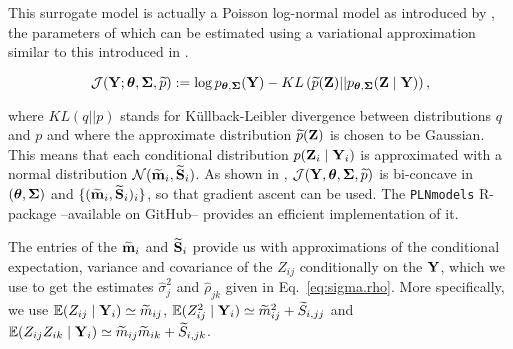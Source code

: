 This surrogate model is actually a Poisson log-normal model as introduced by \cite{AiH89}, the parameters of which can be estimated using a variational approximation similar to this introduced in \cite{CMR18}. 
\begin{linenomath} 
\begin{equation}\label{eq:LowerBound}
\mathcal{J}({\bf Y}; {\boldsymbol{\theta}}, {\boldsymbol{\Sigma}}, \widetilde{p}) := \log p_{{\boldsymbol{\theta}}, {\boldsymbol{\Sigma}}}({\bf Y}) - KL\left(\widetilde{p}({\bf Z}) || p_{{\boldsymbol{\theta}}, {\boldsymbol{\Sigma}}}({\bf Z} \mid {\bf Y})\right),
\end{equation}
\end{linenomath}
where $KL(q||p)$ stands for Küllback-Leibler divergence between distributions $q$ and $p$ and where the approximate distribution $\widetilde{p}({\bf Z})$ 
is chosen to be Gaussian. This means that each conditional distribution $p({\bf Z}_i \mid {\bf Y}_i)$ is approximated with a normal distribution $\mathcal{N}(\widetilde{\bf m}_i, \widetilde{\bf S}_i)$. As shown in \cite{CMR18}, $\mathcal{J}({\bf Y}, {\boldsymbol{\theta}}, {\boldsymbol{\Sigma}}, \widetilde{p})$ is bi-concave in $({\boldsymbol{\theta}}, {\boldsymbol{\Sigma}})$ and $\{(\widetilde{\bf m}_i, \widetilde{\bf S}_i)_i\}$, so that gradient ascent can be used. The {\tt PLNmodels} R-package --available on GitHub-- provides an efficient implementation of it.

The entries of the $\widetilde{\bf m}_i$ and $\widetilde{\bf S}_i$ provide us with approximations of the conditional expectation,  variance and covariance of the $Z_{ij}$ conditionally on the ${\bf Y}$, which we use to get the estimates $\widehat{\sigma}_j^2$ and $\widehat{\rho}_{jk}$ given in Eq.~\eqref{eq:sigma.rho}. More specifically, we use $\operatorname*{\mathbb{E}}(Z_{ij} \mid {\bf Y}_i) \simeq \widetilde{m}_{ij}$, $\operatorname*{\mathbb{E}}(Z^2_{ij} \mid {\bf Y}_i) \simeq \widetilde{m}_{ij}^2 + \widetilde{S}_{i,jj}$ and $\operatorname*{\mathbb{E}}(Z_{ij} Z_{ik} \mid {\bf Y}_i) \simeq \widetilde{m}_{ij} \widetilde{m}_{ik} + \widetilde{S}_{i, jk}$.